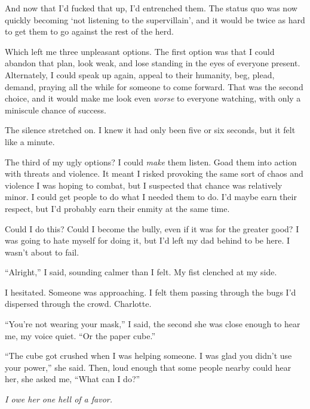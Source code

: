 And now that I'd fucked that up, I'd entrenched them.  The status quo was now quickly becoming `not listening to the supervillain', and it would be twice as hard to get them to go against the rest of the herd.



Which left me three unpleasant options.  The first option was that I could abandon that plan, look weak, and lose standing in the eyes of everyone present.  Alternately, I could speak up again, appeal to their humanity, beg, plead, demand, praying all the while for someone to come forward.  That was the second choice, and it would make me look even \emph{worse} to everyone watching, with only a miniscule chance of success.



The silence stretched on.  I knew it had only been five or six seconds, but it felt like a minute.



The third of my ugly options?  I could \emph{make} them listen.  Goad them into action with threats and violence.  It meant I risked provoking the same sort of chaos and violence I was hoping to combat, but I suspected that chance was relatively minor.  I could get people to do what I needed them to do.  I'd maybe earn their respect, but I'd probably earn their enmity at the same time.



Could I do this?  Could I become the bully, even if it was for the greater good?  I was going to hate myself for doing it, but I'd left my dad behind to be here.  I wasn't about to fail.



``Alright,'' I said, sounding calmer than I felt.  My fist clenched at my side.



I hesitated.  Someone was approaching.  I felt them passing through the bugs I'd dispersed through the crowd.  Charlotte.



``You're not wearing your mask,'' I said, the second she was close enough to hear me, my voice quiet.  ``Or the paper cube.''



``The cube got crushed when I was helping someone.  I was glad you didn't use your power,'' she said.  Then, loud enough that some people nearby could hear her, she asked me, ``What can I do?''



\emph{I owe her one hell of a favor.}



